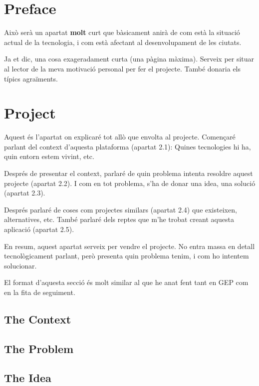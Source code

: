 \documentclass[a4paper,12pt]{article}
\begin{document}


\tableofcontents{\newpage}
\thispagestyle{empty}

\setcounter{page}{1}

\section{Preface}

Això serà un apartat {\bf molt} curt que bàsicament anirà de com està la
situació actual de la tecnologia, i com està afectant al desenvolupament de les
ciutats.

Ja et dic, una cosa exageradament curta (una pàgina màxima). Serveix per situar
al lector de la meva motivació personal per fer el projecte. També donaria els
típics agraïments.

\section{Project}

Aquest és l'apartat on explicaré tot allò que envolta al projecte. Començaré
parlant del context d'aquesta plataforma (apartat 2.1): Quines tecnologies hi
ha, quin entorn estem vivint, etc.

Després de presentar el context, parlaré de quin problema intenta resoldre
aquest projecte (apartat 2.2). I com en tot problema, s'ha de donar una idea,
una solució (apartat 2.3).

Després parlaré de coses com projectes similars (apartat 2.4) que existeixen,
alternatives, etc. També parlaré dels reptes que m'he trobat creant aquesta
aplicació (apartat 2.5).

En resum, aquest apartat serveix per vendre el projecte. No entra massa en
detall tecnològicament parlant, però presenta quin problema tenim, i com ho
intentem solucionar.

El format d'aquesta secció és molt similar al que he anat fent tant en GEP com
en la fita de seguiment.

\subsection{The Context}
\subsection{The Problem}
\subsection{The Idea}
\end{document}
